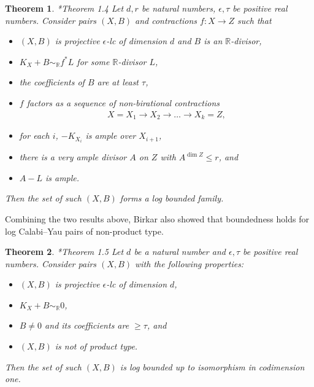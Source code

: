 \documentclass[11pt]{ip-journal}
\newtheorem{theorem}{Theorem}[section]
\theoremstyle{definition}
\begin{document}
\begin{theorem}
\cite{1811.10709}*{Theorem 1.4}
\label{birk.tower.thm}
Let $d, r$ be natural numbers, $\epsilon, \tau$ be positive real numbers.
Consider pairs $(X, B)$ and contractions $f \colon X \to Z$ such that 
\begin{itemize}
    \item 
$(X, B)$ 
is projective 
$\epsilon$-lc 
of dimension 
$d$ 
and 
$B$ 
is an $\mathbb R$-divisor,

    \item 
$K_X+B \sim_\mathbb{R} f^\ast L$ 
for some 
$\mathbb{R}$-divisor 
$L$,
    
    \item 
the coefficients of 
$B$ 
are at least 
$\tau$,

    \item 
$f$ 
factors as a sequence of non-birational contractions
    \begin{align}
\label{mfs.tower.eq}
X = X_1 \to X_2 \to \dots \to X_k = Z,
    \end{align}
    
    \item 
for each 
$i$, 
$-K_{X_i}$ 
is ample over 
$X_{i+1}$,
    
    \item 
there is a very ample divisor 
$A$ 
on 
$Z$ 
with 
$A^{\dim Z} \leq r$, 
and 

    \item 
$A-L$ 
is ample.
\end{itemize}
Then the set of such $(X, B)$ forms a log bounded family.
\end{theorem}

Combining the two results above, Birkar also showed that boundedness holds for log Calabi--Yau pairs of non-product type.

\begin{theorem}
\cite{1811.10709}*{Theorem 1.5}
\label{lcy.fib.non-prod.thm}
Let $d$ be a natural number and $\epsilon,\tau$ be positive real numbers. 
Consider pairs $(X,B)$ with the following properties: 
\begin{itemize}
\item $(X,B)$ is projective $\epsilon$-lc of dimension $d$,

\item $K_X+B\sim_\mathbb{R} 0$, 

\item $B\neq 0$ and its coefficients are $\ge \tau$, and

\item $(X,B)$ is not of product type.   
\end{itemize}
Then the set of such $(X,B)$ is log bounded up to isomorphism in codimension one.
\end{theorem}
\end{document}
